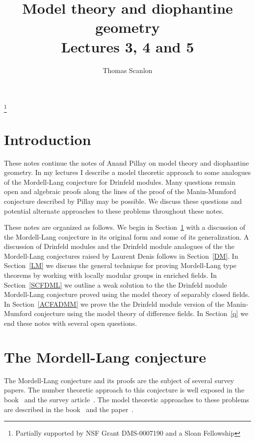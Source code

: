 \documentclass{amsart}
\theoremstyle{definition}
\theoremstyle{remark}
\begin{document}
\title{Model theory and diophantine geometry \\
Lectures 3, 4 and 5}
\author{Thomas Scanlon}
\thanks{Partially supported by NSF Grant DMS-0007190 and a
Sloan Fellowship}
\address{University of California, Berkeley \\
Department of Mathematics \\
Evans Hall \\
Berkeley, CA 94720-3480 \\
USA}
\maketitle


\section*{Introduction}
These notes continue the notes of Anand Pillay on model theory and
diophantine geometry.  In my lectures I describe a model theoretic
approach to some analogues of the Mordell-Lang conjecture for Drinfeld
modules.  Many questions remain open and algebraic proofs along the lines
of the proof of the Manin-Mumford conjecture described by Pillay may be
possible.  We discuss these questions and potential alternate approaches to
these problems throughout these notes.

These notes are organized as follows.  We begin 
in Section~\ref{MLs} with a discussion 
of the Mordell-Lang conjecture in its original form and some of its 
generalization.  A discussion of Drinfeld modules and the Drinfeld module
analogues of the the Mordell-Lang conjectures raised by Laurent Denis 
follows in Section~\ref{DM}.  In Section~\ref{LM} we discuss the 
general technique for proving Mordell-Lang type theorems by working with 
locally modular groups in enriched fields.   In Section~\ref{SCFDML} we 
outline a weak solution to the the Drinfeld module Mordell-Lang conjecture
proved using the model theory of separably closed fields.   
In Section~\ref{ACFADMM} we prove the the Drinfeld module version of the 
Manin-Mumford conjecture using the model theory of difference fields.
In Section~\ref{q} we end these notes with several open questions.


\section{The Mordell-Lang conjecture}
\label{MLs}

The Mordell-Lang conjecture and its proofs are the subject of several 
survey papers.  The number theoretic approach to this conjecture is
well exposed in the book~\cite{Lang} and the survey article~\cite{Maz}.  
The model theoretic approaches to these problems are described in the 
book~\cite{Bou} and the paper~\cite{ScDGMT}.  
\end{document}
